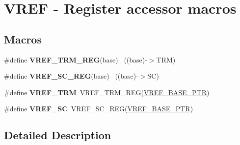 \hypertarget{group___v_r_e_f___register___accessor___macros}{}\section{V\+R\+E\+F -\/ Register accessor macros}
\label{group___v_r_e_f___register___accessor___macros}
\subsection*{Macros}
\begin{DoxyCompactItemize}
\item 
\hypertarget{group___v_r_e_f___register___accessor___macros_ga58dc43651bdee9df31cca4b7cf50a2f1}{}\#define {\bfseries V\+R\+E\+F\+\_\+\+T\+R\+M\+\_\+\+R\+E\+G}(base)                                          ~((base)-\/$>$T\+R\+M)\label{group___v_r_e_f___register___accessor___macros_ga58dc43651bdee9df31cca4b7cf50a2f1}

\item 
\hypertarget{group___v_r_e_f___register___accessor___macros_gab8590b69eb308634188edd3d3f4bfbb6}{}\#define {\bfseries V\+R\+E\+F\+\_\+\+S\+C\+\_\+\+R\+E\+G}(base)                                            ~((base)-\/$>$S\+C)\label{group___v_r_e_f___register___accessor___macros_gab8590b69eb308634188edd3d3f4bfbb6}

\item 
\hypertarget{group___v_r_e_f___register___accessor___macros_ga3d9a836081732fa55a44bde53a2cb932}{}\#define {\bfseries V\+R\+E\+F\+\_\+\+T\+R\+M}~V\+R\+E\+F\+\_\+\+T\+R\+M\+\_\+\+R\+E\+G(\hyperlink{group___v_r_e_f___peripheral_ga53dba79dbefcdd6f788740a6d0caa57d}{V\+R\+E\+F\+\_\+\+B\+A\+S\+E\+\_\+\+P\+T\+R})\label{group___v_r_e_f___register___accessor___macros_ga3d9a836081732fa55a44bde53a2cb932}

\item 
\hypertarget{group___v_r_e_f___register___accessor___macros_ga58353078d385155f1c55fad5802549bb}{}\#define {\bfseries V\+R\+E\+F\+\_\+\+S\+C}~V\+R\+E\+F\+\_\+\+S\+C\+\_\+\+R\+E\+G(\hyperlink{group___v_r_e_f___peripheral_ga53dba79dbefcdd6f788740a6d0caa57d}{V\+R\+E\+F\+\_\+\+B\+A\+S\+E\+\_\+\+P\+T\+R})\label{group___v_r_e_f___register___accessor___macros_ga58353078d385155f1c55fad5802549bb}

\end{DoxyCompactItemize}


\subsection{Detailed Description}
